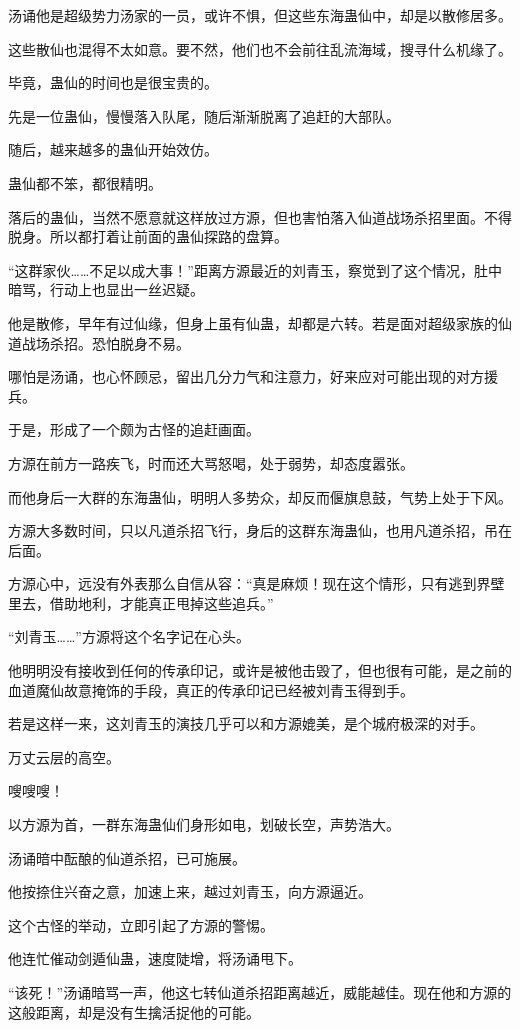 \begin{this_body}
汤诵他是超级势力汤家的一员，或许不惧，但这些东海蛊仙中，却是以散修居多。

这些散仙也混得不太如意。要不然，他们也不会前往乱流海域，搜寻什么机缘了。

毕竟，蛊仙的时间也是很宝贵的。

先是一位蛊仙，慢慢落入队尾，随后渐渐脱离了追赶的大部队。

随后，越来越多的蛊仙开始效仿。

蛊仙都不笨，都很精明。

落后的蛊仙，当然不愿意就这样放过方源，但也害怕落入仙道战场杀招里面。不得脱身。所以都打着让前面的蛊仙探路的盘算。

“这群家伙……不足以成大事！”距离方源最近的刘青玉，察觉到了这个情况，肚中暗骂，行动上也显出一丝迟疑。

他是散修，早年有过仙缘，但身上虽有仙蛊，却都是六转。若是面对超级家族的仙道战场杀招。恐怕脱身不易。

哪怕是汤诵，也心怀顾忌，留出几分力气和注意力，好来应对可能出现的对方援兵。

于是，形成了一个颇为古怪的追赶画面。

方源在前方一路疾飞，时而还大骂怒喝，处于弱势，却态度嚣张。

而他身后一大群的东海蛊仙，明明人多势众，却反而偃旗息鼓，气势上处于下风。

方源大多数时间，只以凡道杀招飞行，身后的这群东海蛊仙，也用凡道杀招，吊在后面。

方源心中，远没有外表那么自信从容：“真是麻烦！现在这个情形，只有逃到界壁里去，借助地利，才能真正甩掉这些追兵。”

“刘青玉……”方源将这个名字记在心头。

他明明没有接收到任何的传承印记，或许是被他击毁了，但也很有可能，是之前的血道魔仙故意掩饰的手段，真正的传承印记已经被刘青玉得到手。

若是这样一来，这刘青玉的演技几乎可以和方源媲美，是个城府极深的对手。

万丈云层的高空。

嗖嗖嗖！

以方源为首，一群东海蛊仙们身形如电，划破长空，声势浩大。

汤诵暗中酝酿的仙道杀招，已可施展。

他按捺住兴奋之意，加速上来，越过刘青玉，向方源逼近。

这个古怪的举动，立即引起了方源的警惕。

他连忙催动剑遁仙蛊，速度陡增，将汤诵甩下。

“该死！”汤诵暗骂一声，他这七转仙道杀招距离越近，威能越佳。现在他和方源的这般距离，却是没有生擒活捉他的可能。


\end{this_body}
